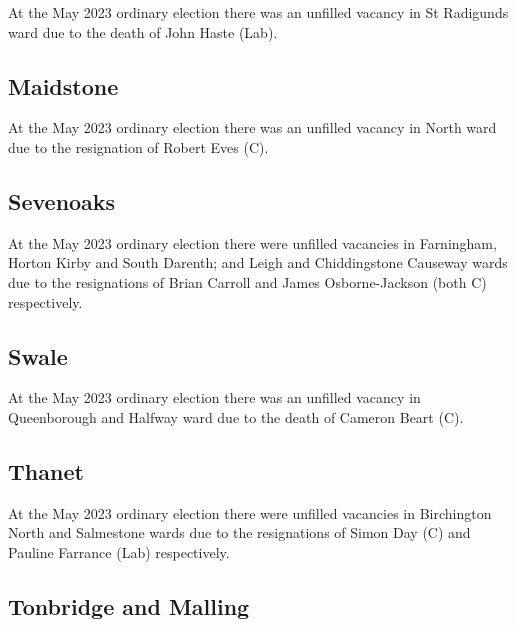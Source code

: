 \documentclass[a4paper,openany]{book}
\begin{document}
\begin{resultsiii}
At the May 2023 ordinary election there was an unfilled vacancy in St Radigunds ward due to the death of John Haste (Lab).%

\subsection*{Maidstone}

At the May 2023 ordinary election there was an unfilled vacancy in North ward due to the resignation of Robert Eves (C).%

\subsection*{Sevenoaks}

At the May 2023 ordinary election there were unfilled vacancies in Farningham, Horton Kirby and South Darenth; and Leigh and Chiddingstone Causeway wards due to the resignations of Brian Carroll and James Osborne-Jackson (both C) respectively.%
%

\subsection*{Swale}

At the May 2023 ordinary election there was an unfilled vacancy in Queenborough and Halfway ward due to the death of Cameron Beart (C).%

\subsection*{Thanet}

At the May 2023 ordinary election there were unfilled vacancies in Birchington North and Salmestone wards due to the resignations of Simon Day (C) and Pauline Farrance (Lab) respectively.%
%
%

\subsection*{Tonbridge and Malling}


\end{resultsiii}
\end{document}
